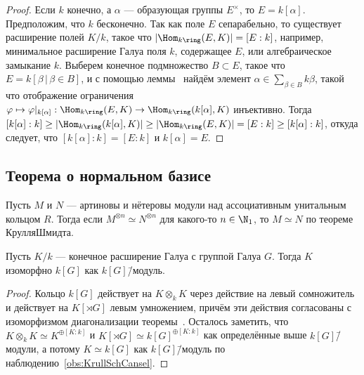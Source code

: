 \documentclass[
	extrafontsizes,
	11pt,
	hyphens,
]{memoir}
\begin{document}
\begin{proof}
Если \(k\) конечно, а \(\alpha\) --- образующая группы \(E^{\times}\), то \(E = k[\alpha]\).
Предположим, что \(k\) бесконечно.
Так как поле \(E\) сепарабельно, то существует расширение полей \(K/k\), такое что \(\lvert \Hom_{k\ring}(E, K) \rvert = [E : k]\), например, минимальное расширение Галуа поля \(k\), содержащее \(E\), или алгебраическое замыкание \(k\).
Выберем конечное подмножество \(B \subset E\), такое что \(E = k[\beta \,|\, \beta \in B]\),
и с помощью леммы~ найдём элемент
\(\alpha \in \sum_{\beta \in B} k \beta\),
такой что отображение ограничения
\(\varphi \mapsto \varphi|_{k[\alpha]} : \Hom_{k\ring}(E, K) \to \Hom_{k\ring}(k[\alpha], K)\)
инъективно.
Тогда
\([k[\alpha] : k] \geq \lvert \Hom_{k\ring}(k[\alpha], K) \rvert \geq \lvert \Hom_{k\ring}(E, K) \rvert = [E : k] \geq [k[\alpha] : k]\),
откуда следует, что \([k[\alpha] : k] = [E : k]\) и \(k[\alpha] = E\).
\end{proof}

\subsection{Теорема о нормальном базисе}

\begin{observation}
Пусть \(M\) и \(N\) --- артиновы и нётеровы модули над ассоциативным унитальным кольцом \(R\).
\label{obs:KrullSchCansel}
Тогда если \(M^{\otimes n} \simeq N^{\otimes n}\) для какого-то \(n \in \N_1\), то \(M \simeq N\) по теореме Крулля\namedash{}Шмидта.
\end{observation}

\begin{theorem}
Пусть \(K/k\) --- конечное расширение Галуа с группой Галуа \(G\).%
\label{thm:NormalBasis}
Тогда \(K\) изоморфно \(k[G]\) как \(k[G]\)\=/модуль.
\end{theorem}

\begin{proof}
Кольцо \(k[G]\) действует на \(K \otimes_k K\) через действие на левый сомножитель и действует на \(K[\rtimes G]\) левым умножением,
причём эти действия согласованы с изоморфизмом диагонализации теоремы~.
Осталось заметить, что \(K \otimes_k K \simeq K^{\oplus [K : k]}\) и \(K[\rtimes G] \simeq k[G]^{\oplus [K : k]}\) как определённые выше \(k[G]\)\=/модули,
а потому \(K \simeq k[G]\) как \(k[G]\)\=/модуль по наблюдению~\ref{obs:KrullSchCansel}.
\end{proof}
\end{document}
